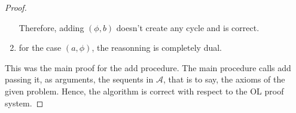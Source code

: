 \documentclass[a4paper, 11pt]{article}
\begin{document}
\begin{proof}
\begin{enumerate}
			    Therefore, adding $(\phi,b)$ doesn't create any cycle and is correct.
		    \item
			    for the case $(a,\phi)$, the reasonning is completely dual.
	    \end{enumerate}
	    This was the main proof for the \textsf{add} procedure. The main procedure calls \textsf{add}
	    passing it,
	    as arguments, the sequents in $\mathcal{A}$, that is to say, the axioms of the given problem.
	    Hence, the algorithm is correct with respect to the OL proof system.
    \end{proof}
\end{document}
